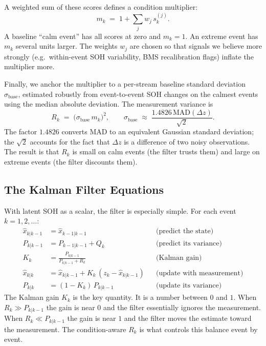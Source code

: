 \documentclass[11pt]{article}
\begin{document}
A weighted sum of these scores defines a condition multiplier:
\begin{equation}
m_k \;=\; 1 + \sum_{j} w_j\, s^{(j)}_k.
\label{eq:condition_multiplier}
\end{equation}
A baseline ``calm event'' has all scores at zero and \(m_k = 1\). An
extreme event has \(m_k\) several units larger. The weights \(w_j\)
are chosen so that signals we believe more strongly (e.g.\ within-event
SOH variability, BMS recalibration flags) inflate the multiplier more.

Finally, we anchor the multiplier to a per-stream baseline standard
deviation \(\sigma_{\mathrm{base}}\), estimated robustly from
event-to-event SOH changes on the calmest events using the median
absolute deviation. The measurement variance is
\begin{equation}
R_k \;=\; \big(\sigma_{\mathrm{base}}\, m_k\big)^{2},
\qquad
\sigma_{\mathrm{base}} \;\approx\; \frac{1.4826\,\mathrm{MAD}(\Delta z)}{\sqrt{2}}.
\label{eq:R_k}
\end{equation}
The factor \(1.4826\) converts MAD to an equivalent Gaussian standard
deviation; the \(\sqrt{2}\) accounts for the fact that \(\Delta z\) is a
difference of two noisy observations. The result is that
\(R_k\) is small on calm events (the filter trusts them) and large on
extreme events (the filter discounts them).

\subsection{The Kalman Filter Equations}

With latent SOH as a scalar, the filter is especially simple. For each
event \(k = 1, 2, \dots\):
\begin{align}
\widehat{x}_{k|k-1} &= \widehat{x}_{k-1|k-1}             &&\text{(predict the state)} \label{eq:state_pred}\\
P_{k|k-1}           &= P_{k-1|k-1} + Q_k                  &&\text{(predict its variance)} \label{eq:cov_pred}\\
K_k                 &= \frac{P_{k|k-1}}{P_{k|k-1} + R_k}  &&\text{(Kalman gain)} \label{eq:gain}\\
\widehat{x}_{k|k}   &= \widehat{x}_{k|k-1} + K_k\,(z_k - \widehat{x}_{k|k-1}) &&\text{(update with measurement)} \label{eq:update}\\
P_{k|k}             &= (1 - K_k)\,P_{k|k-1}               &&\text{(update its variance)} \label{eq:cov_update}
\end{align}
The Kalman gain \(K_k\) is the key quantity. It is a number between
\(0\) and \(1\). When \(R_k \gg P_{k|k-1}\) the gain is near \(0\) and
the filter essentially ignores the measurement. When \(R_k \ll P_{k|k-1}\)
the gain is near \(1\) and the filter moves the estimate toward the
measurement. The condition-aware \(R_k\) is what controls this
balance event by event.
\end{document}

